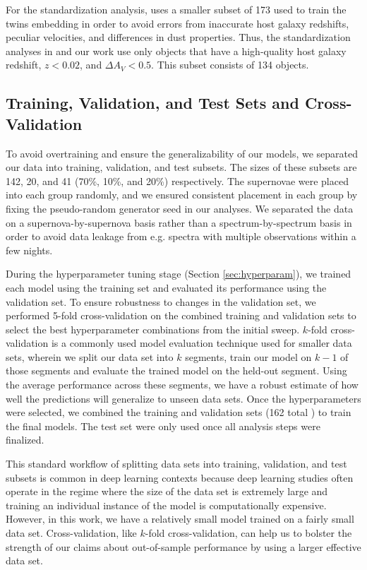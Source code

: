 For the standardization analysis,  uses a smaller subset of 173 \sne{} used to train the twins embedding in order to avoid errors from inaccurate host galaxy redshifts, peculiar velocities, and differences in dust properties. Thus, the standardization analyses in  and our work use only objects that have a high-quality host galaxy redshift, $z<0.02$, and $\Delta A_V < 0.5$. This subset consists of 134 objects.

\subsection{Training, Validation, and Test Sets and Cross-Validation}
\label{sec:nn_twins_data_split}
To avoid overtraining and ensure the generalizability of our models, we separated our data into training, validation, and test subsets. The sizes of these subsets are 142, 20, and 41 (70\%, 10\%, and 20\%) respectively. The supernovae were placed into each group randomly, and we ensured consistent placement in each group by fixing the pseudo-random generator seed in our analyses. We separated the data on a supernova-by-supernova basis rather than a spectrum-by-spectrum basis in order to avoid data leakage from e.g. spectra with multiple observations within a few nights.

During the hyperparameter tuning stage (Section \ref{sec:hyperparam}), we trained each model using the training set and evaluated its performance using the validation set. To ensure robustness to changes in the validation set, we performed 5-fold cross-validation on the combined training and validation sets to select the best hyperparameter combinations from the initial sweep. $k$-fold cross-validation is a commonly used model evaluation technique used for smaller data sets, wherein we split our data set into $k$ segments, train our model on $k-1$ of those segments and evaluate the trained model on the held-out segment. Using the average performance across these segments, we have a robust estimate of how well the predictions will generalize to unseen data sets. Once the hyperparameters were selected, we combined the training and validation sets (162 total \sne) to train the final models. The test set \sne{} were only used once all analysis steps were finalized.

This standard workflow of splitting data sets into training, validation, and test subsets is common in deep learning contexts because deep learning studies often operate in the regime where the size of the data set is extremely large and training an individual instance of the model is computationally expensive. However, in this work, we have a relatively small model trained on a fairly small data set. Cross-validation, like $k$-fold cross-validation, can help us to bolster the strength of our claims about out-of-sample performance by using a larger effective data set.

